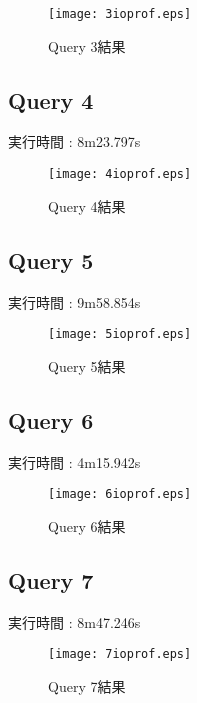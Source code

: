 \documentclass[11pt,a4paper]{jsarticle}
\begin{document}
\begin{figure}[thbp]
 \begin{center}
  \texttt{[image: 3ioprof.eps]}
 \end{center}
 \caption{Query 3結果}
 \label{fig:q3}
\end{figure}

\subsection{Query 4}
実行時間 : 8m23.797s

\begin{figure}[thbp]
 \begin{center}
  \texttt{[image: 4ioprof.eps]}
 \end{center}
 \caption{Query 4結果}
 \label{fig:q4}
\end{figure}

\newpage
\subsection{Query 5}
実行時間 : 9m58.854s

\begin{figure}[thbp]
 \begin{center}
  \texttt{[image: 5ioprof.eps]}
 \end{center}
 \caption{Query 5結果}
 \label{fig:q5}
\end{figure}

\subsection{Query 6}
実行時間 : 4m15.942s

\begin{figure}[thbp]
 \begin{center}
  \texttt{[image: 6ioprof.eps]}
 \end{center}
 \caption{Query 6結果}
 \label{fig:q6}
\end{figure}

\subsection{Query 7}
実行時間 : 8m47.246s

\begin{figure}[thbp]
 \begin{center}
  \texttt{[image: 7ioprof.eps]}
 \end{center}
 \caption{Query 7結果}
 \label{fig:q7}
\end{figure}
\end{document}
